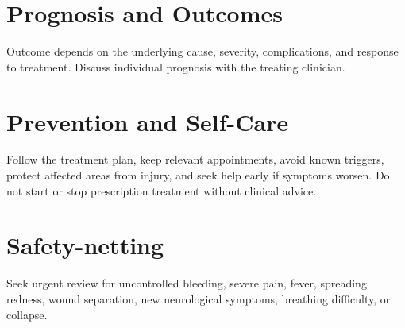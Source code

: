 \section*{Prognosis and Outcomes}
Outcome depends on the underlying cause, severity, complications, and response to treatment. Discuss individual prognosis with the treating clinician.

\section*{Prevention and Self-Care}
Follow the treatment plan, keep relevant appointments, avoid known triggers, protect affected areas from injury, and seek help early if symptoms worsen. Do not start or stop prescription treatment without clinical advice.
\section*{Safety-netting}
Seek urgent review for uncontrolled bleeding, severe pain, fever, spreading redness, wound separation, new neurological symptoms, breathing difficulty, or collapse.
